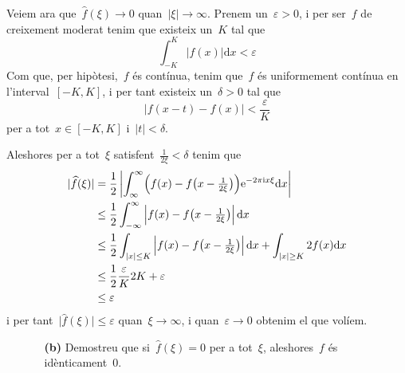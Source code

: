 \documentclass[a4paper]{article}
\theoremstyle{definition}
\newcommand{\iu}{\mathrm{i}}
\newcommand{\e}{\mathrm{e}}
\newcommand{\uppi}{\pi}
\newcommand{\diff}{\mathrm{d}}
\newcommand{\abs}[1]{\lvert{#1}\rvert}
\newcommand{\Abs}[1]{\left\lvert{#1}\right\rvert}
\begin{document}
Veiem ara que~\(\widehat{f}(\xi)\to0\) quan~\(\abs{\xi}\to\infty\).
Prenem un~\(\varepsilon>0\), i per ser~\(f\) de creixement moderat tenim que
existeix un~\(K\) tal que
\[
    \int_{-K}^{K} \abs{f(x)} \diff x < \varepsilon
\]
Com que, per hipòtesi,~\(f\) és contínua, tenim que~\(f\) és uniformement
contínua en l'interval~\([-K,K]\), i per tant existeix un~\(\delta>0\) tal que
\[
    \abs{f(x - t) - f(x)} < \frac{\varepsilon}{K}
\]
per a tot~\(x\in[-K,K]\) i~\(\abs{t}<\delta\).

Aleshores per a tot~\(\xi\) satisfent~\(\frac{1}{2\xi}<\delta\) tenim que
\begin{align*}
    \abs{\widehat{f}(\xi)} &= \frac{1}{2} \Abs{\int_{\infty}^{\infty}
                              \Bigl(
                                  f(x) - f\bigl(
                                      x - {\textstyle\frac{1}{2\xi}}
                                  \bigr)
                              \Bigr)
                              \e^{-2\uppi\iu x\xi}
                              \diff x} \\
                           &\leq \frac{1}{2} \int_{-\infty}^{\infty}
                              \Abs{f(x) - f\bigl(
                                      x - {\textstyle\frac{1}{2\xi}}
                              \bigr)}
                              \diff x \\
                           &\leq \frac{1}{2} \int_{\abs{x}\leq K}
                              \Abs{f(x) - f\bigl(
                                      x - {\textstyle\frac{1}{2\xi}}
                              \bigr)}
                              \diff x
                              +
                              \int_{\abs{x}\geq K}
                              2f(x)
                              \diff x \\
                           &\leq \frac{1}{2}
                              \frac{\varepsilon}{K}2K
                              +\varepsilon \\
                           &\leq \varepsilon
\end{align*}
i per tant~\(\abs{\widehat{f}(\xi)} \leq \varepsilon\) quan~\(\xi\to\infty\), i
quan~\(\varepsilon\to0\) obtenim el que volíem.

\begin{enumerate}
    \item[]\begin{enumerate}
        \item[\textbf{(b)}] Demostreu que si~\(\widehat{f}(\xi) = 0\) per a
            tot~\(\xi\), aleshores~\(f\) és idènticament~\(0\).
    \end{enumerate}
\end{enumerate}
\end{document}
